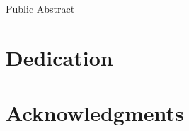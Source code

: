 \documentclass[12pt]{report}
\renewcommand\[{\begin{equation}}
\renewcommand\]{\end{equation}}
\begin{document}
\else

\fi

\ifx\mypublicabstract\undefined
\else
\vfill

\pagebreak

\thispagestyle{empty}

\begin{center}


{\large \mytitle}


\vfill


\myauthor


\vfill


Public Abstract


\vfill


\end{center}




\vfill

\fi

\ifx\mygrants\undefined
\else
  \mygrants
\fi

\pagebreak


\ifx\mydedication\undefined
\else
\chapter*{Dedication}
  \mydedication
\fi

\ifx\myacknowledgements\undefined
\else
  \chapter*{Acknowledgments}
  \myacknowledgements
\fi

\pagebreak


\tableofcontents

\pagebreak


\listoffigures

\pagebreak


\listoftables

\pagebreak


\pagestyle{myheadings}

\ifx\mylinespace\undefined
\else
  \mylinespace
\fi

\emergencystretch=10pt
\newcommand{\V}[1]{\boldsymbol{\mathbf{#1}}}
\newcommand{\vect}[1]{\boldsymbol{\mathbf{#1}}}
\newcommand{\arraybegin}[1]{\begin{IEEEeqnarraybox*}[][c]{#1}}
\newcommand{\arrayend}{\end{IEEEeqnarraybox*}}
\newcommand{\unaryminus}{\scalebox{0.75}[1.0]{\( - \)}}
\newcommand{\ubar}[1]{\underaccent{\bar}{#1}}
\end{document}
